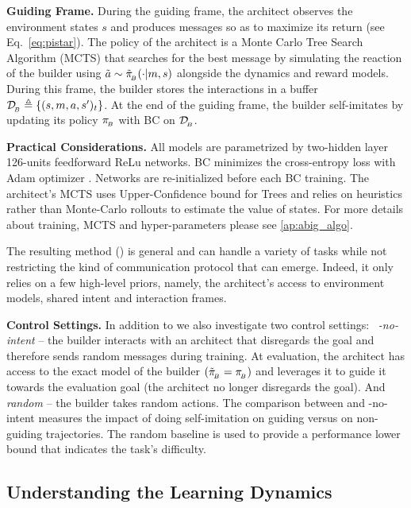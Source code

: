 \noindent\textbf{Guiding Frame. } During the guiding frame, the architect observes the environment states $s$ and produces messages so as to maximize its return (see Eq.~\ref{eq:pistar}). The policy of the architect is a Monte Carlo Tree Search Algorithm (MCTS) \citep{kocsis2006bandit} that searches for the best message by simulating the reaction of the builder using $\tilde{a} \sim \tilde{\pi}_{\!_B}(\cdot|m,s)$ alongside the dynamics and reward models. During this frame, the builder stores the interactions in a buffer $\mathcal{D}_{\!_B} \triangleq\{(s,m,a,s')_t\}$. At the end of the guiding frame, the builder self-imitates by updating its policy $\pi_{\!_B}$ with BC on $\mathcal{D}_{\!_B}$.
%

\noindent\textbf{Practical Considerations. } All models are parametrized by two-hidden layer 126-units feedforward ReLu networks. BC minimizes the cross-entropy loss with Adam optimizer \citep{kingma2014adam}. Networks are re-initialized before each BC training. The architect's MCTS uses Upper-Confidence bound for Trees and relies on heuristics rather than Monte-Carlo rollouts to estimate the value of states. For more details about training, MCTS and hyper-parameters please see \ap\ref{ap:abig_algo}.

The resulting method (\abig) is general and can handle a variety of tasks while not restricting the kind of communication protocol that can emerge. Indeed, it only relies on a few high-level priors, namely, the architect's access to environment models, shared intent and interaction frames. 

\noindent\textbf{Control Settings. } In addition to \abig we also investigate two control settings: 
 \abig~\textit{-no-intent} -- the builder interacts with an architect that disregards the goal and therefore sends random messages during training. At evaluation, the architect has access to the exact model of the builder $(\tilde{\pi}_{\!_B}= \pi_{\!_B})$ and leverages it to guide it towards the evaluation goal (the architect no longer disregards the goal). And \textit{random} -- the builder takes random actions.
The comparison between \abig and \abig-no-intent measures the impact of doing self-imitation on guiding versus on non-guiding trajectories. The random baseline is used to provide a performance lower bound that indicates the task's difficulty.

\subsection{Understanding the Learning Dynamics}
\label{sec:intuition}


